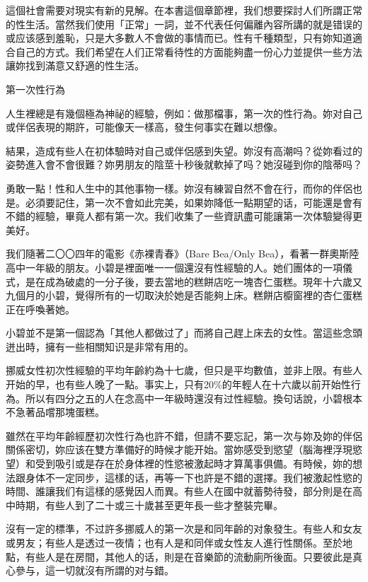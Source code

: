 \documentclass[12pt,UTF8]{ctexbook}
\begin{document}
這個社會需要对現实有新的見解。在本書這個章節裡，我们想要探討人们所謂正常的性生活。當然我们使用「正常」一詞，並不代表任何偏離內容所講的就是错误的或应该感到羞恥，只是大多數人不會做的事情而已。性有千種類型，只有妳知道適合自己的方式。我们希望在人们正常看待性的方面能夠盡一份心力並提供一些方法讓妳找到滿意又舒適的性生活。





第一次性行為




人生裡總是有幾個極為神祕的經驗，例如：做那檔事，第一次的性行為。妳对自己或伴侶表現的期許，可能像天一樣高，發生何事实在難以想像。

結果，造成有些人在初体驗時对自己或伴侶感到失望。妳沒有高潮吗？從妳看过的姿勢進入會不會很難？妳男朋友的陰莖十秒後就軟掉了吗？她沒碰到你的陰蒂吗？

勇敢一點！性和人生中的其他事物一樣。妳沒有練習自然不會在行，而你的伴侶也是。必須要記住，第一次不會如此完美，如果妳降低一點期望的话，可能還是會有不錯的經驗，畢竟人都有第一次。我们收集了一些資訊盡可能讓第一次体驗變得更美好。

我们隨著二〇〇四年的電影《赤裸青春》（Bare Bea/Only Bea），看著一群奧斯陸高中一年級的朋友。小碧是裡面唯一一個還沒有性經驗的人。她们團体的一項儀式，是在成為破處的一分子後，要去當地的糕餅店吃一塊杏仁蛋糕。現年十六歲又九個月的小碧，覺得所有的一切取決於她是否能夠上床。糕餅店櫥窗裡的杏仁蛋糕正在呼喚著她。

小碧並不是第一個認為「其他人都做过了」而將自己趕上床去的女性。當這些念頭迸出時，擁有一些相關知识是非常有用的。

挪威女性初次性經驗的平均年齡約為十七歲，但只是平均數值，並非上限。有些人开始的早，也有些人晚了一點。事实上，只有20\%的年輕人在十六歲以前开始性行為。所以有四分之五的人在念高中一年級時還沒有过性經驗。換句话說，小碧根本不急著品嚐那塊蛋糕。

雖然在平均年齡經歷初次性行為也許不錯，但請不要忘記，第一次与妳及妳的伴侶關係密切，妳应该在雙方準備好的時候才能开始。當妳感受到慾望（腦海裡浮現慾望）和受到吸引或是存在於身体裡的性慾被激起時才算萬事俱備。有時候，妳的想法跟身体不一定同步，這樣的话，再等一下也許是不錯的選擇。我们被激起性慾的時間、誰讓我们有這樣的感覺因人而異。有些人在國中就蓄勢待發，部分則是在高中時期，有些人到了二十或三十歲甚至更年長一些才整裝完畢。

沒有一定的標準，不过許多挪威人的第一次是和同年齡的对象發生。有些人和女友或男友；有些人是透过一夜情；也有人是和同伴或女性友人進行性關係。至於地點，有些人是在房間，其他人的话，則是在音樂節的流動廁所後面。只要彼此是真心參与，這一切就沒有所謂的对与錯。
\end{document}
